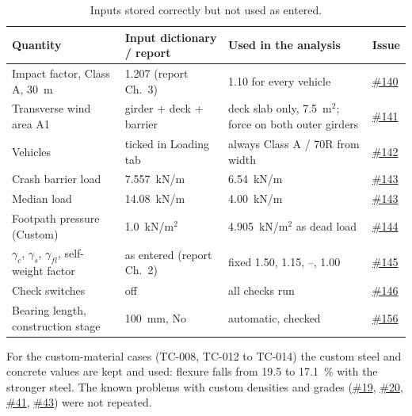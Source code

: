 \documentclass[10pt,a4paper]{article}
\newcommand{\gh}[1]{\href{https://github.com/Nidhikhare12/OsdagBridge/issues/#1}{\##1}}
\newcommand{\issPF}{\gh{145}}   %
\newcommand{\issCS}{\gh{146}}   %
\newcommand{\issBL}{\gh{156}}   %
\begin{document}
\begin{table}[H]
\centering\small
\begin{tabular}{@{}L{4.6cm}L{3.9cm}L{4.4cm}L{2.8cm}@{}}
\toprule
\textbf{Quantity} & \textbf{Input dictionary / report} & \textbf{Used in the analysis} & \textbf{Issue}\\
\midrule
Impact factor, Class A, 30~m & 1.207 (report Ch.~3) & 1.10 for every vehicle & \gh{140}\\
Transverse wind area A1 & girder + deck + barrier & deck slab only, 7.5~m$^2$; force on both outer girders & \gh{141}\\
Vehicles & ticked in Loading tab & always Class A / 70R from width & \gh{142}\\
Crash barrier load & 7.557~kN/m & 6.54~kN/m & \gh{143}\\
Median load & 14.08~kN/m & 4.00~kN/m & \gh{143}\\
Footpath pressure (Custom) & 1.0~kN/m$^2$ & 4.905~kN/m$^2$ as dead load & \gh{144}\\
$\gamma_c$, $\gamma_s$, $\gamma_{fl}$, self-weight factor & as entered (report Ch.~2) & fixed 1.50, 1.15, --, 1.00 & \issPF\\
Check switches & off & all checks run & \issCS\\
Bearing length, construction stage & 100~mm, No & automatic, checked & \issBL\\
\bottomrule
\end{tabular}
\caption{Inputs stored correctly but not used as entered.}
\end{table}

For the custom-material cases (TC-008, TC-012 to TC-014) the custom steel and concrete values are kept and used: flexure falls from 19.5 to 17.1~\% with the stronger steel. The known problems with custom densities and grades (\gh{19}, \gh{20}, \gh{41}, \gh{43}) were not repeated.
\end{document}
